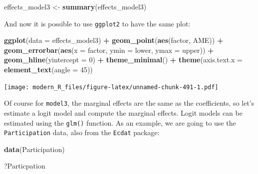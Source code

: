 \documentclass[]{gitbook}
\newenvironment{Shaded}{\begin{snugshade}}{\end{snugshade}}
\newcommand{\DataTypeTok}[1]{\textcolor[rgb]{0.13,0.29,0.53}{#1}}
\newcommand{\DecValTok}[1]{\textcolor[rgb]{0.00,0.00,0.81}{#1}}
\newcommand{\KeywordTok}[1]{\textcolor[rgb]{0.13,0.29,0.53}{\textbf{#1}}}
\newcommand{\NormalTok}[1]{#1}
\newcommand{\OperatorTok}[1]{\textcolor[rgb]{0.81,0.36,0.00}{\textbf{#1}}}
\newcommand{\StringTok}[1]{\textcolor[rgb]{0.31,0.60,0.02}{#1}}
\begin{document}
\begin{Shaded}
\begin{Highlighting}[]
\NormalTok{effects_model3 <-}\StringTok{ }\KeywordTok{summary}\NormalTok{(effects_model3)}
\end{Highlighting}
\end{Shaded}

And now it is possible to use \texttt{ggplot2} to have the same plot:

\begin{Shaded}
\begin{Highlighting}[]
\KeywordTok{ggplot}\NormalTok{(}\DataTypeTok{data =}\NormalTok{ effects_model3) }\OperatorTok{+}
\StringTok{  }\KeywordTok{geom_point}\NormalTok{(}\KeywordTok{aes}\NormalTok{(factor, AME)) }\OperatorTok{+}
\StringTok{  }\KeywordTok{geom_errorbar}\NormalTok{(}\KeywordTok{aes}\NormalTok{(}\DataTypeTok{x =}\NormalTok{ factor, }\DataTypeTok{ymin =}\NormalTok{ lower, }\DataTypeTok{ymax =}\NormalTok{ upper)) }\OperatorTok{+}
\StringTok{  }\KeywordTok{geom_hline}\NormalTok{(}\DataTypeTok{yintercept =} \DecValTok{0}\NormalTok{) }\OperatorTok{+}
\StringTok{  }\KeywordTok{theme_minimal}\NormalTok{() }\OperatorTok{+}
\StringTok{  }\KeywordTok{theme}\NormalTok{(}\DataTypeTok{axis.text.x =} \KeywordTok{element_text}\NormalTok{(}\DataTypeTok{angle =} \DecValTok{45}\NormalTok{))}
\end{Highlighting}
\end{Shaded}

\texttt{[image: modern\_R\_files/figure-latex/unnamed-chunk-491-1.pdf]}

Of course for \texttt{model3}, the marginal effects are the same as the coefficients, so let's estimate a
logit model and compute the marginal effects. Logit models can be estimated using the \texttt{glm()} function.
As an example, we are going to use the \texttt{Participation} data, also from the \texttt{Ecdat} package:

\begin{Shaded}
\begin{Highlighting}[]
\KeywordTok{data}\NormalTok{(Participation)}
\end{Highlighting}
\end{Shaded}

\begin{Shaded}
\begin{Highlighting}[]
\NormalTok{?Particpation}
\end{Highlighting}
\end{Shaded}
\end{document}
